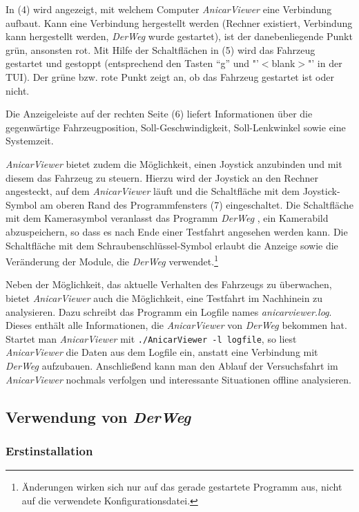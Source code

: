 \documentclass[a4paper, 11pt]{article}
\newcommand{\DerWeg}{\textit{DerWeg }}  %
\newcommand{\AnicarViewer}{\textit{AnicarViewer }}  %
\begin{document}
{In (4) wird angezeigt, mit welchem Computer \AnicarViewer eine Verbindung aufbaut. Kann eine Verbindung hergestellt werden (Rechner existiert, Verbindung kann hergestellt werden, \DerWeg wurde gestartet), ist der danebenliegende Punkt grün, ansonsten rot. Mit Hilfe der Schaltflächen in (5) wird das Fahrzeug gestartet und gestoppt (entsprechend den Tasten "`g"' und "'\!$<$\!blank\!$>$\!"' in der TUI). Der grüne bzw. rote Punkt zeigt an, ob das Fahrzeug gestartet ist oder nicht.

Die Anzeigeleiste auf der rechten Seite (6) liefert Informationen über die gegenwärtige Fahrzeugposition, Soll-Geschwindigkeit, Soll-Lenkwinkel sowie eine Systemzeit.

\AnicarViewer bietet zudem die Möglichkeit, einen Joystick anzubinden und mit diesem das Fahrzeug zu steuern. Hierzu wird der Joystick an den Rechner angesteckt, auf dem \AnicarViewer läuft und die Schaltfläche mit dem Joystick-Symbol am oberen Rand des Programmfensters (7) eingeschaltet. Die Schaltfläche mit dem Kamerasymbol veranlasst das Programm \DerWeg, ein Kamerabild abzuspeichern, so dass es nach Ende einer Testfahrt angesehen werden kann. Die Schaltfläche mit dem Schraubenschlüssel-Symbol erlaubt die Anzeige sowie die Veränderung der Module, die \DerWeg verwendet.\footnote{Änderungen wirken sich nur auf das gerade gestartete Programm aus, nicht auf die verwendete Konfigurationsdatei.}

Neben der Möglichkeit, das aktuelle Verhalten des Fahrzeugs zu überwachen, bietet \AnicarViewer auch die Möglichkeit, eine Testfahrt im Nachhinein zu analysieren. Dazu schreibt das Programm ein Logfile names \textit{anicarviewer.log}. Dieses enthält alle Informationen, die \AnicarViewer von \DerWeg bekommen hat. Startet man \AnicarViewer mit \texttt{./AnicarViewer -l logfile}, so liest \AnicarViewer die Daten aus dem Logfile ein, anstatt eine Verbindung mit \DerWeg aufzubauen. Anschließend kann man den Ablauf der Versuchsfahrt im \AnicarViewer nochmals verfolgen und interessante Situationen offline analysieren.

\subsection{Verwendung von \DerWeg}

\subsubsection{Erstinstallation}

}
\end{document}
